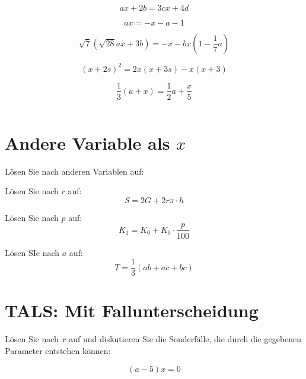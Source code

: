 {\begin{bbwAufgabenBlock}
\item $$ax + 2b = 3cx +4d$$

\item $$ax = -x-a-1$$

\item $$\sqrt{7}\left(\sqrt{28}ax+3b\right) = -x-bx\left(1-\frac17a\right)$$

\item $$(x+2s)^2 = 2x(x+3s)-x(x+3)$$

\item $$\frac13(a+x) = \frac12 a + \frac{x}5$$

\item $$$$
\LoesungsBlock{$\lx=\{\}$}
\end{bbwAufgabenBlock}
\newpage
\section{Andere Variable als $x$}
Lösen Sie nach anderen Variablen auf:

\begin{bbwAufgabenBlock}

\item Lösen Sie nach $r$ auf:
 $$S= 2G + 2r\pi\cdot{}h$$

\item
Lösen Sie nach $p$ auf:
$$K_1 = K_0 + K_0 \cdot{}\frac{p}{100}$$

\item Lösen SIe nach $a$ auf:
$$T = \frac13 (ab + ac + bc)$$

\end{bbwAufgabenBlock}
\newpage
\section{TALS: Mit Fallunterscheidung}
Lösen Sie nach $x$ auf und diskutieren Sie die Sonderfälle, die durch
die gegebenen Parameter entstehen können:
\begin{bbwAufgabenBlock}
\item $$(a-5)x = 0$$


\end{bbwAufgabenBlock}}
